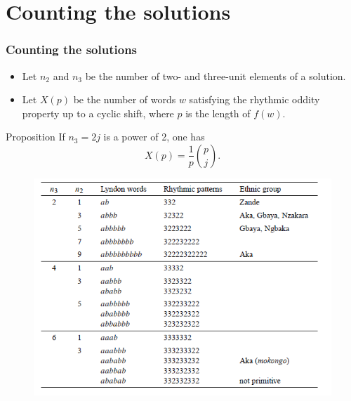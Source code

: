 \documentclass{beamer}
\theoremstyle{definition}
\begin{document}
\section{Counting the solutions}



\begin{frame}
\frametitle{Counting the solutions}
\begin{itemize}


\item
 Let $n_2$ and $n_3$ be the number of two- and three-unit
elements of a solution. 

\item<2->Let $X(p)$ be the number of words $w$ satisfying the
rhythmic oddity property up to a cyclic shift, where $p$
is the length of $f (w)$.
\end{itemize}\pause

\begin{alertblock}{Proposition}
If $n_3 = 2j$ is a power of 2, one has
$$X(p)=\frac{1}{p}\binom{p}{j}.$$
\end{alertblock}
\end{frame}

\begin{frame}[fragile]
\begin{figure}[h!]
\includegraphics[scale=0.5]{tabla}
\end{figure}

\end{frame}
\end{document}
